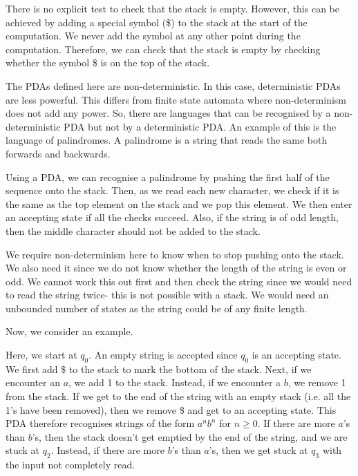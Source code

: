 \documentclass[a4paper, openany]{memoir}
\begin{document}
There is no explicit test to check that the stack is empty. However, this can be achieved by adding a special symbol (\$) to the stack at the start of the computation. We never add the symbol at any other point during the computation. Therefore, we can check that the stack is empty by checking whether the symbol \$ is on the top of the stack.

The PDAs defined here are non-deterministic. In this case, deterministic PDAs are less powerful. This differs from finite state automata where non-determinism does not add any power. So, there are languages that can be recognised by a non-deterministic PDA but not by a deterministic PDA. An example of this is the language of palindromes. A palindrome is a string that reads the same both forwards and backwards.

Using a PDA, we can recognise a palindrome by pushing the first half of the sequence onto the stack. Then, as we read each new character, we check if it is the same as the top element on the stack and we pop this element. We then enter an accepting state if all the checks succeed. Also, if the string is of odd length, then the middle character should not be added to the stack.

We require non-determinism here to know when to stop pushing onto the stack. We also need it since we do not know whether the length of the string is even or odd. We cannot work this out first and then check the string since we would need to read the string twice- this is not possible with a stack. We would need an unbounded number of states as the string could be of any finite length.

Now, we consider an example.
\begin{figure}[H]
    \centering
\end{figure}
\noindent Here, we start at $q_0$. An empty string is accepted since $q_0$ is an accepting state. We first add \$ to the stack to mark the bottom of the stack. Next, if we encounter an $a$, we add 1 to the stack. Instead, if we encounter a $b$, we remove 1 from the stack. If we get to the end of the string with an empty stack (i.e. all the 1's have been removed), then we remove \$ and get to an accepting state. This PDA therefore recognises strings of the form $a^n b^n$ for $n \geq 0$. If there are more $a$'s than $b$'s, then the stack doesn't get emptied by the end of the string, and we are stuck at $q_2$. Instead, if there are more $b$'s than $a$'s, then we get stuck at $q_3$ with the input not completely read.
\end{document}

